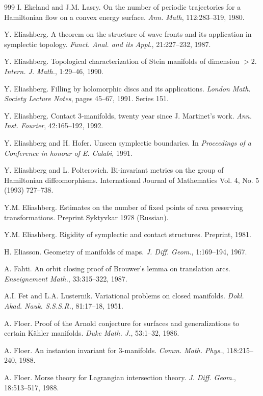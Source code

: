 \begin{thebibliography}{999}
 I. Ekeland and J.M. Lasry. On the number of periodic
trajectories for a Hamiltonian flow on
a convex energy surface. \emph{Ann. Math}, 112:283--319, 1980.

 Y. Eliashberg. A theorem on the structure of wave fronts and
its application in symplectic topology. \emph{Funct. Anal. and its Appl.},
21:227--232, 1987.

 Y. Eliashberg. Topological characterization of Stein
manifolds of dimension $> 2$. \emph{Intern. J. Math.}, 1:29--46, 1990.

 Y. Eliashberg. Filling by holomorphic discs and its
applications. \emph{London Math. Society Lecture Notes}, pages 45--67,
1991. Series 151.

 Y. Eliashberg. Contact 3-manifolds, twenty year since
J. Martinet's work. \emph{Ann. Inst. Fourier}, 42:165--192, 1992.

 Y. Eliashberg and H. Hofer. Unseen symplectic boundaries.
In \emph{Proceedings of a Conference in honour of E. Calabi}, 1991.

 Y. Eliashberg and L. Polterovich. Bi-invariant metrics on
the group of Hamiltonian diffeomorphisms. International Journal of
Mathematics Vol. 4, No. 5 (1993) 727--738.

 Y.M. Eliashberg. Estimates on the number of fixed points of
area preserving transformations. Preprint Syktyvkar 1978 (Russian).

 Y.M. Eliashberg. Rigidity of symplectic and contact
structures. Preprint, 1981.

 H. Eliasson. Geometry of manifolds of maps.
\emph{J. Diff. Geom.}, 1:169--194, 1967.

 A. Fahti. An orbit closing proof of Brouwer's lemma on
translation arcs. \emph{Enseignement Math.}, 33:315--322, 1987.

 A.I. Fet and L.A. Lusternik. Variational problems on closed
manifolds. \emph{Dokl. Akad. Nauk. S.S.S.R.}, 81:17--18, 1951.

 A. Floer. Proof of the Arnold conjecture for surfaces and
generalizations to certain Kähler manifolds. \emph{Duke Math. J.},
53:1--32, 1986.

 A. Floer. An instanton invariant for 3-manifolds.
\emph{Comm. Math. Phys.}, 118:215--240, 1988.

 A. Floer. Morse theory for Lagrangian intersection theory.
\emph{J. Diff. Geom.}, 18:513--517, 1988.


\end{thebibliography}
